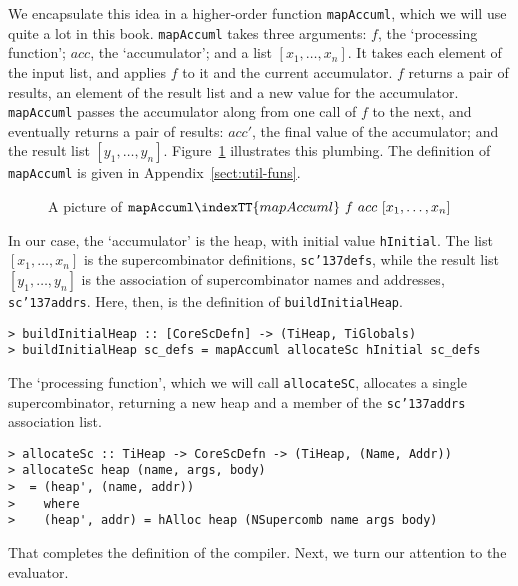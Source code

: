 We encapsulate this idea in a higher-order function
\mbox{\tt mapAccuml}, which
we will use quite a lot in this book.  \mbox{\tt mapAccuml} takes three
arguments: $f$, the `processing function'; $acc$, the
`accumulator'; and a list $[x_1, \ldots, x_n]$.  It takes each
element of the input list, and applies $f$ to it and the current
accumulator.  $f$ returns a pair of results, an
element of the result list and a new value for the accumulator.
\mbox{\tt mapAccuml} passes the accumulator along from one call of $f$ to the
next, and eventually returns a pair of results: $acc'$, the final
value of the accumulator; and the result list $[y_1, \ldots, y_n]$.
Figure~\ref{fig:mapAccuml} illustrates this plumbing.  The definition
of \mbox{\tt mapAccuml} is given in Appendix~\ref{sect:util-funs}.
\begin{figure} %

\caption{A picture of $\mbox{\tt mapAccuml}\indexTT{mapAccuml}~f~acc~[x_1,\ldots,x_n]$}
\label{fig:mapAccuml}
\end{figure}

In our case, the `accumulator' is the heap, with initial value
\mbox{\tt hInitial}.  The list $[x_1,\ldots,x_n]$ is the supercombinator
definitions, \mbox{\tt sc{\char'137}defs}, while the result list $[y_1, \ldots, y_n]$ is
the association of supercombinator names and addresses, \mbox{\tt sc{\char'137}addrs}.
Here, then, is the definition of \mbox{\tt buildInitialHeap}.
\begin{verbatim}
> buildInitialHeap :: [CoreScDefn] -> (TiHeap, TiGlobals)
> buildInitialHeap sc_defs = mapAccuml allocateSc hInitial sc_defs
\end{verbatim}
%
%
\par
The `processing function', which we will call \mbox{\tt allocateSC},
allocates a single supercombinator, returning a new heap and a member
of the \mbox{\tt sc{\char'137}addrs} association list.
\begin{verbatim}
> allocateSc :: TiHeap -> CoreScDefn -> (TiHeap, (Name, Addr))
> allocateSc heap (name, args, body)
>  = (heap', (name, addr))
>    where
>    (heap', addr) = hAlloc heap (NSupercomb name args body)
\end{verbatim}
%
%
That completes the definition of the compiler. Next, we turn our attention
to the evaluator.

